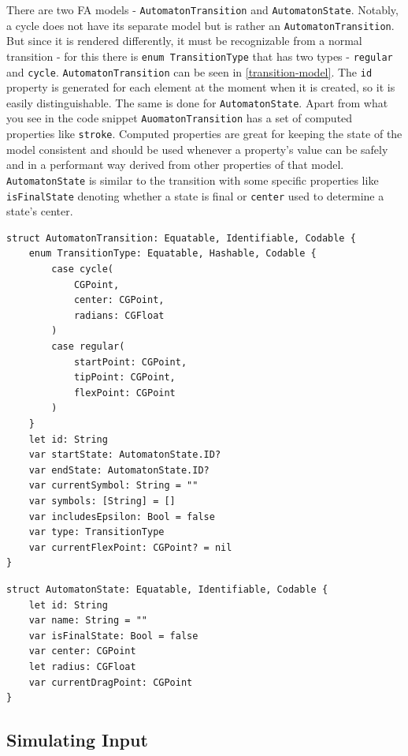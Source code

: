 There are two FA models - \lstinline{AutomatonTransition} and \lstinline{AutomatonState}. Notably, a cycle does not have its separate model but is rather an \lstinline{AutomatonTransition}. But since it is rendered differently, it must be recognizable from a normal transition - for this there is \lstinline{enum TransitionType} that has two types - \lstinline{regular} and \lstinline{cycle}. \lstinline{AutomatonTransition} can be seen in \ref{transition-model}. The \lstinline{id} property is generated for each element at the moment when it is created, so it is easily distinguishable. The same is done for \lstinline{AutomatonState}.  Apart from what you see in the code snippet \lstinline{AuomatonTransition} has a set of computed properties like \lstinline{stroke}. Computed properties are great for keeping the state of the model consistent and should be used whenever a property's value can be safely and in a performant way derived from other properties of that model. \lstinline{AutomatonState} is similar to the transition with some specific properties like \lstinline{isFinalState} denoting whether a state is final or \lstinline{center} used to determine a state's center.

\begin{lstlisting}[caption={Transition model}, label=transition-model]
struct AutomatonTransition: Equatable, Identifiable, Codable {
    enum TransitionType: Equatable, Hashable, Codable {
        case cycle(
            CGPoint, 
            center: CGPoint, 
            radians: CGFloat
        )
        case regular(
            startPoint: CGPoint, 
            tipPoint: CGPoint, 
            flexPoint: CGPoint
        )
    }
    let id: String
    var startState: AutomatonState.ID?
    var endState: AutomatonState.ID?
    var currentSymbol: String = ""
    var symbols: [String] = []
    var includesEpsilon: Bool = false
    var type: TransitionType
    var currentFlexPoint: CGPoint? = nil
}
\end{lstlisting}

\begin{lstlisting}[caption={State model}, label=state-model]
struct AutomatonState: Equatable, Identifiable, Codable {
    let id: String
    var name: String = ""
    var isFinalState: Bool = false
    var center: CGPoint
    let radius: CGFloat
    var currentDragPoint: CGPoint
}
\end{lstlisting}

\subsection{Simulating Input}

